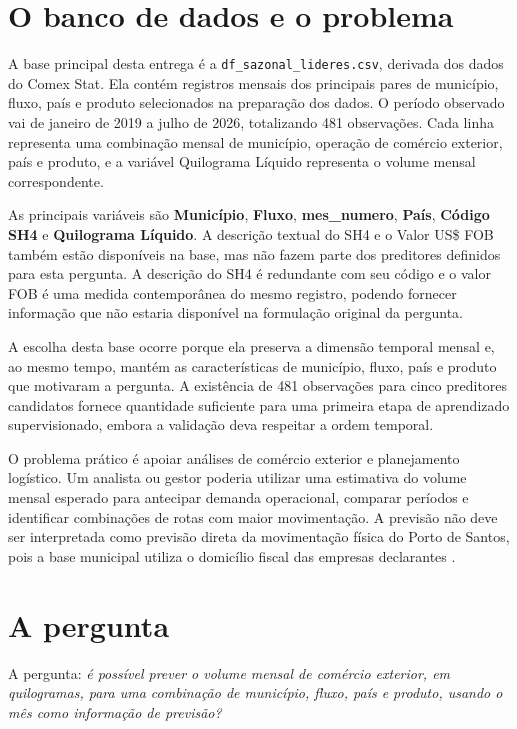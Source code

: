 \documentclass[
  article,12pt,oneside,a4paper,english,brazil
]{abntex2}
\begin{document}
\section{O banco de dados e o problema}

A base principal desta entrega é a \texttt{df\_sazonal\_lideres.csv}, derivada
dos dados do Comex Stat. Ela contém registros mensais dos principais pares de
município, fluxo, país e produto selecionados na preparação dos dados. O
período observado vai de janeiro de 2019 a julho de 2026, totalizando
481 observações. Cada linha representa uma combinação mensal de
município, operação de comércio exterior, país e produto, e a variável
{Quilograma Líquido} representa o volume mensal correspondente.

As principais variáveis são \textbf{Município}, \textbf{Fluxo},
\textbf{mes\_numero}, \textbf{País}, \textbf{Código SH4} e
\textbf{Quilograma Líquido}. A descrição textual do SH4 e o
{Valor US\$ FOB} também estão disponíveis na base, mas não fazem parte
dos preditores definidos para esta pergunta. A descrição do SH4 é redundante
com seu código e o valor FOB é uma medida contemporânea do mesmo registro,
podendo fornecer informação que não estaria disponível na formulação original
da pergunta.

A escolha desta base ocorre porque ela preserva a dimensão temporal mensal e,
ao mesmo tempo, mantém as características de município, fluxo, país e
produto que motivaram a pergunta. A existência de 481 observações para cinco
preditores candidatos fornece quantidade suficiente para uma primeira etapa
de aprendizado supervisionado, embora a validação deva respeitar a ordem
temporal.

O problema prático é apoiar análises de comércio exterior e planejamento
logístico. Um analista ou gestor poderia utilizar uma estimativa do volume
mensal esperado para antecipar demanda operacional, comparar períodos e
identificar combinações de rotas com maior movimentação. A previsão não deve
ser interpretada como previsão direta da movimentação física do Porto de
Santos, pois a base municipal utiliza o domicílio fiscal das empresas
declarantes \cite{mdic_comexstat_faq}.

\section{A pergunta}

A pergunta: \textit{é possível prever o volume mensal
de comércio exterior, em quilogramas, para uma combinação de município,
fluxo, país e produto, usando o mês como informação de previsão?}
\end{document}
